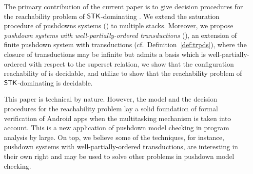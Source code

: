 The primary contribution of the current paper is to give decision procedures for the reachability problem of $\mathsf{STK}$-dominating {\AMASS}. We extend the saturation procedure of pushdowns systems (\PDS) to multiple stacks.  Moreover, we propose \emph{pushdown systems with well-partially-ordered transductions} (\WOTrPDS), an extension of finite pushdown system with transductions (cf.\ Definition~\ref{def:trpds}), where the closure of transductions may be infinite but admits a basis which is well-partially-ordered with respect to the superset relation, we show that the configuration reachability of {\WOTrPDS} is decidable, and utilize {\WOTrPDS} to show that the reachability problem of $\mathsf{STK}$-dominating {\AMASS} is decidable.

This paper is technical by nature. However, the model {\AMASS} and the decision procedures for the reachability problem lay a solid foundation of formal verification of Android apps when the multitasking mechanism is taken into account. This is a new application of pushdown model checking in program analysis by large. On top, we believe some of the techniques, for instance, pushdown systems with well-partially-ordered transductions, are interesting in their own right and may be used to solve other  problems in pushdown model checking.     


